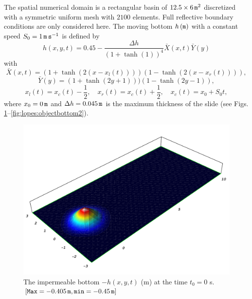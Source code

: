 The spatial numerical domain is a rectangular basin of
$12.5\times 6\, {\tt m}^2$ discretized with a symmetric
uniform mesh with $2100$ elements.  Full reflective boundary
conditions are only considered here.  The moving bottom $h\,
({\tt m})$ with a constant speed $S_0=1\, {\tt m\, s}^{-1}$
is defined by
\begin{equation}\label{eq:lopes:bottom1}
h(x,y,t)=0.45-\frac{\Delta h}{(1+\tanh(1))^4}{\bar
  X}(x,t){\bar Y}(y)
\end{equation}
with
\begin{equation}
{\bar X}(x,t)=(1+\tanh(2(x-x_l(t))))(1-\tanh(2(x-x_r(t)))),
\end{equation}
\begin{equation}
{\bar Y}(y)=(1+\tanh(2y+1)))(1-\tanh(2y-1)),
\end{equation}
\begin{equation}\label{eq:lopes:bottom4}
x_l(t)=x_c(t)-\frac{1}{2},\quad
x_r(t)=x_c(t)+\frac{1}{2},\quad x_c(t)=x_0+S_0t,
\end{equation}
 where $x_0=0\, {\tt m}$ and $\Delta h=0.045\, {\tt m}$ is the maximum
 thickness of the slide (see
 Figs. \ref{fig:lopes:objectbottom}--\ref{fig:lopes:objectbottom2}).
\begin{figure}
\begin{center}
\includegraphics[width=\largefig]{chapters/lopes/pdf/depth0.pdf}
\end{center}
\caption{The impermeable bottom $-h(x,y,t)$ (m) at
  the time $t_0=0$ s. $[{\tt Max}= -0.405\, {\tt m},
    {\tt min}=-0.45\,{\tt m}]$}
\label{fig:lopes:objectbottom}
\end{figure}
